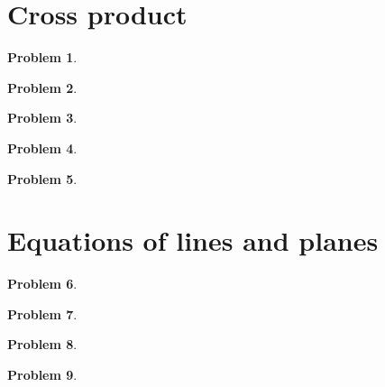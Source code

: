 \documentclass{article}
\newtheorem{problem}{Problem}
\begin{document}
\section{Cross product}

\begin{problem}

\end{problem}

\begin{problem}

\end{problem}

\begin{problem}

\end{problem}



\begin{problem}

\end{problem}

\begin{problem}

\end{problem}

\section{Equations of lines and planes}

\begin{problem}

\end{problem}

\begin{problem}

\end{problem}

\begin{problem}

\end{problem}


\begin{problem}

\end{problem}

\end{document}
